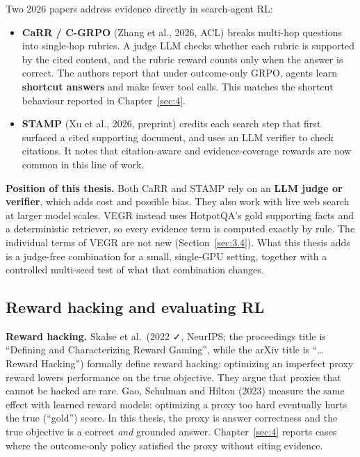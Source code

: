 Two 2026 papers address evidence directly in search-agent RL:

\begin{itemize}
\tightlist
\item
  \textbf{CaRR / C-GRPO} (Zhang et al., 2026, ACL) breaks multi-hop
  questions into single-hop rubrics. A judge LLM checks whether each
  rubric is supported by the cited content, and the rubric reward counts
  only when the answer is correct. The authors report that under
  outcome-only GRPO, agents learn \textbf{shortcut answers} and make
  fewer tool calls. This matches the shortcut behaviour reported in
  Chapter~\ref{sec:4}.
\item
  \textbf{STAMP} (Xu et al., 2026, preprint) credits each search step
  that first surfaced a cited supporting document, and uses an LLM
  verifier to check citations. It notes that citation-aware and
  evidence-coverage rewards are now common in this line of work.
\end{itemize}

\textbf{Position of this thesis.} Both CaRR and STAMP rely on an
\textbf{LLM judge or verifier}, which adds cost and possible bias. They
also work with live web search at larger model scales. VEGR instead uses
HotpotQA's gold supporting facts and a deterministic retriever, so every
evidence term is computed exactly by rule. The individual terms of VEGR
are not new (Section~\ref{sec:3.4}). What this thesis adds is a
judge-free combination for a small, single-GPU setting, together with a
controlled multi-seed test of what that combination changes.

\subsection{Reward hacking and evaluating RL}\label{sec:2.8}

\textbf{Reward hacking.} Skalse et al.~(2022 ✓, NeurIPS; the proceedings
title is ``Defining and Characterizing Reward Gaming'', while the arXiv
title is ``\ldots Reward Hacking'') formally define reward hacking:
optimizing an imperfect proxy reward lowers performance on the true
objective. They argue that proxies that cannot be hacked are rare. Gao,
Schulman and Hilton (2023) measure the same effect with learned reward
models: optimizing a proxy too hard eventually hurts the true (``gold'')
score. In this thesis, the proxy is answer correctness and the true
objective is a correct \emph{and} grounded answer. Chapter~\ref{sec:4}
reports cases where the outcome-only policy satisfied the proxy without
citing evidence.

